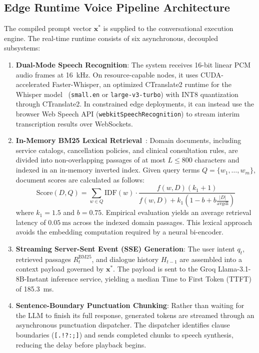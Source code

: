 \documentclass[review,12pt,times,authoryear]{elsarticle}
\theoremstyle{definition}
\begin{document}
\subsection{Edge Runtime Voice Pipeline Architecture}
The compiled prompt vector $\bm{x}^*$ is supplied to the conversational execution engine. The real-time runtime consists of six asynchronous, decoupled subsystems:

\begin{enumerate}
  \item \textbf{Dual-Mode Speech Recognition}: The system receives 16-bit linear PCM audio frames at \SI{16}{\kilo\hertz}. On resource-capable nodes, it uses CUDA-accelerated Faster-Whisper, an optimized CTranslate2 runtime for the Whisper model~\citep{Radford2023} (\texttt{small.en} or \texttt{large-v3-turbo}) with INT8 quantization through CTranslate2. In constrained edge deployments, it can instead use the browser Web Speech API (\texttt{webkitSpeechRecognition}) to stream interim transcription results over WebSockets.
  \item \textbf{In-Memory BM25 Lexical Retrieval}~\citep{Robertson2009}: Domain documents, including service catalogs, cancellation policies, and clinical consultation rules, are divided into non-overlapping passages of at most $L \le 800$ characters and indexed in an in-memory inverted index. Given query terms $Q = \{w_1, \ldots, w_m\}$, document scores are calculated as follows:
  \begin{equation}
    \mathrm{Score}(D, Q) = \sum_{w \in Q} \mathrm{IDF}(w) \cdot \frac{f(w, D)(k_1 + 1)}{f(w, D) + k_1\left(1 - b + b\frac{|D|}{\mathrm{avgdl}}\right)}
    \label{eq:bm25}
  \end{equation}
  where $k_1 = 1.5$ and $b = 0.75$. Empirical evaluation yields an average retrieval latency of $\SI{0.05}{\milli\second}$ across the indexed domain passages. This lexical approach avoids the embedding computation required by a neural bi-encoder.
  \item \textbf{Streaming Server-Sent Event (SSE) Generation}: The user intent $q_t$, retrieved passages $R_t^{\mathrm{BM25}}$, and dialogue history $H_{t-1}$ are assembled into a context payload governed by $\bm{x}^*$. The payload is sent to the Groq Llama-3.1-8B-Instant inference service, yielding a median Time to First Token (TTFT) of \SI{185.3}{\milli\second}.
  \item \textbf{Sentence-Boundary Punctuation Chunking}: Rather than waiting for the LLM to finish its full response, generated tokens are streamed through an asynchronous punctuation dispatcher. The dispatcher identifies clause boundaries (\texttt{[.!?:;]}) and sends completed chunks to speech synthesis, reducing the delay before playback begins.

\end{enumerate}
\end{document}
